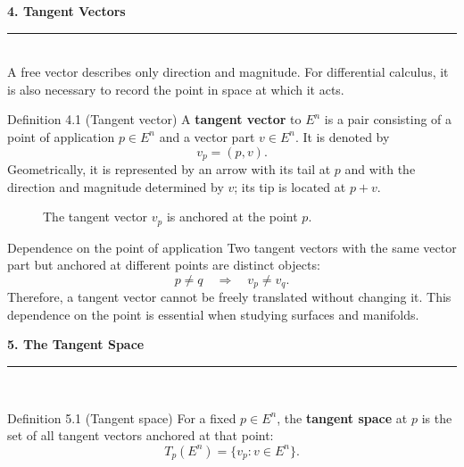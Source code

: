 \documentclass[11pt,letterpaper]{article}
\newcommand{\manualsection}[1]{%
  \Needspace{12\baselineskip}%
  \vspace{0.35cm}
  {\Large\bfseries\color{blackmain} #1}\\[2pt]
  {\color{orangeacc}\rule{\linewidth}{1.4pt}}\\[0.25cm]
}
\newcommand{\term}[1]{\textbf{\color{orangeacc}#1}}
\begin{document}
\manualsection{4. Tangent Vectors}

A free vector describes only direction and magnitude. For differential calculus,
it is also necessary to record the point in space at which it acts.

\begin{infobox}[orangeacc]{Definition 4.1 (Tangent vector)}
A \term{tangent vector} to $E^n$ is a pair consisting of a point of application
$p\in E^n$ and a vector part $v\in E^n$. It is denoted by
\begin{equation}
  v_p=(p,v).
\end{equation}
Geometrically, it is represented by an arrow with its tail at $p$ and with the
direction and magnitude determined by $v$; its tip is located at $p+v$.
\end{infobox}

\begin{figure}[htbp]
\centering
{}
\caption{The tangent vector $v_p$ is anchored at the point $p$.}
\label{fig:tangent-vector}
\end{figure}
\FloatBarrier

\begin{theorembox}{Dependence on the point of application}
Two tangent vectors with the same vector part but anchored at different points
are distinct objects:
\begin{equation}
  p\ne q \quad\Longrightarrow\quad v_p\ne v_q.
\end{equation}
Therefore, a tangent vector cannot be freely translated without changing it. This
dependence on the point is essential when studying surfaces and manifolds.
\end{theorembox}

\manualsection{5. The Tangent Space}

\begin{infobox}[blackmain]{Definition 5.1 (Tangent space)}
For a fixed $p\in E^n$, the \term{tangent space} at $p$ is the set of all tangent
vectors anchored at that point:
\begin{equation}
  T_p(E^n)=\{v_p:v\in E^n\}.
\end{equation}
\end{infobox}
\end{document}
